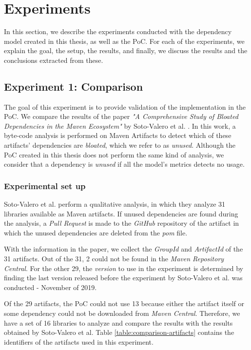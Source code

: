 \chapter{Experiments}\label{ch:Experiments}
In this section, we describe the experiments conducted with the dependency model created in this thesis, as well as the PoC. For each of the experiments, we explain the goal, the setup, the results, and finally, we discuss the results and the conclusions extracted from these.

\section{Experiment 1: Comparison}\label{sec:Exp1}
The goal of this experiment is to provide validation of the implementation in the PoC. We compare the results of the paper \textit{"A Comprehensive Study of Bloated Dependencies in the Maven Ecosystem"} by Soto-Valero et al. \cite{soto2020comprehensive}. In this work, a byte-code analysis is performed on Maven Artifacts to detect which of these artifacts' dependencies are \textit{bloated}, which we refer to as \textit{unused}. Although the PoC created in this thesis does not perform the same kind of analysis, we consider that a dependency is \textit{unused} if all the model's metrics detects no usage.

\subsection{Experimental set up}
Soto-Valero et al. perform a qualitative analysis, in which they analyze 31 libraries available as Maven artifacts. If unused dependencies are found during the analysis, a \textit{Pull Request} is made to the \textit{GitHub} repository of the artifact in which the unused dependencies are deleted from the \textit{pom} file.

With the information in the paper, we collect the \textit{GroupId} and \textit{ArtifactId} of the 31 artifacts. Out of the 31, 2 could not be found in the \textit{Maven Repository Central}. For the other 29, the \textit{version} to use in the experiment is determined by finding the last version released before the experiment by Soto-Valero et al. was conducted - November of 2019.

Of the 29 artifacts, the PoC could not use 13 because either the artifact itself or some dependency could not be downloaded from \textit{Maven Central}. Therefore, we have a set of 16 libraries to analyze and compare the results with the results obtained by Soto-Valero et al. Table \ref{table:comparison-artifacts} contains the identifiers of the artifacts used in this experiment.


